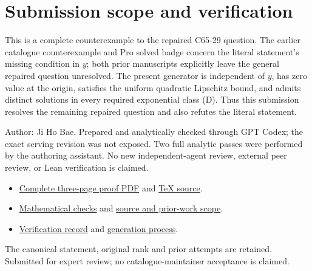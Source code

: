 \documentclass[11pt]{article}
\begin{document}
\normalsize
\section*{Submission scope and verification}
This is a complete counterexample to the repaired C65-29 question. The earlier catalogue counterexample and Pro solved badge concern the literal statement's missing condition in $y$; both prior manuscripts explicitly leave the general repaired question unresolved. The present generator is independent of $y$, has zero value at the origin, satisfies the uniform quadratic Lipschitz bound, and admits distinct solutions in every required exponential class (D). Thus this submission resolves the remaining repaired question and also refutes the literal statement.

Author: Ji Ho Bae. Prepared and analytically checked through GPT Codex; the exact serving revision was not exposed. Two full analytic passes were performed by the authoring assistant. No new independent-agent review, external peer review, or Lean verification is claimed.

\begin{itemize}
\item \href{https://github.com/jbaelaw/nonconvex-bsde-all-exponential-nonuniqueness/blob/841d20e8862a2ab7bac7d7b212088c21056e8fd6/paper/Proof.pdf}{Complete three-page proof PDF} and \href{https://github.com/jbaelaw/nonconvex-bsde-all-exponential-nonuniqueness/blob/841d20e8862a2ab7bac7d7b212088c21056e8fd6/paper/Proof.tex}{TeX source}.
\item \href{https://github.com/jbaelaw/nonconvex-bsde-all-exponential-nonuniqueness/blob/841d20e8862a2ab7bac7d7b212088c21056e8fd6/verification/Review.md}{Mathematical checks} and \href{https://github.com/jbaelaw/nonconvex-bsde-all-exponential-nonuniqueness/blob/841d20e8862a2ab7bac7d7b212088c21056e8fd6/verification/SourceAudit.md}{source and prior-work scope}.
\item \href{https://github.com/jbaelaw/nonconvex-bsde-all-exponential-nonuniqueness/blob/841d20e8862a2ab7bac7d7b212088c21056e8fd6/verification/Verification.json}{Verification record} and \href{https://github.com/jbaelaw/nonconvex-bsde-all-exponential-nonuniqueness/blob/841d20e8862a2ab7bac7d7b212088c21056e8fd6/provenance/Process.md}{generation process}.
\end{itemize}
The canonical statement, original rank and prior attempts are retained. Submitted for expert review; no catalogue-maintainer acceptance is claimed.
\end{document}
